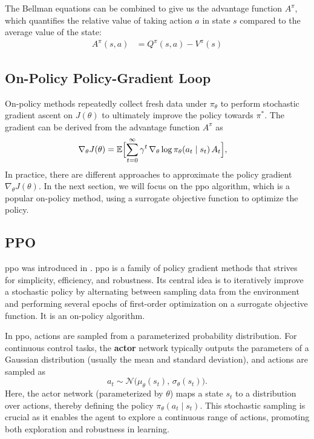 The Bellman equations can be combined to give us the advantage function \(A^\pi\), which quantifies the relative value of taking action \(a\) in state \(s\) compared to the average value of the state:
\begin{align}
\label{eq:advantage}
A^\pi(s,a)
&= Q^\pi(s,a) - V^\pi(s)
\end{align}

\subsection{On-Policy Policy-Gradient Loop}  
On-policy methods repeatedly collect fresh data under \(\pi_\theta\) to perform stochastic gradient ascent on \(J(\theta)\) to ultimately improve the policy towards \(\pi^*\). The gradient can be derived from the advantage function \(A^\pi\) as
\begin{align}
\label{eq:policy_gradient}
\nabla_\theta J(\theta)
&= \mathbb{E}\Bigl[\sum_{t=0}^\infty \gamma^t\,\nabla_\theta \log \pi_\theta(a_t\mid s_t)\,A_t\Bigr],
\end{align}
In practice, there are different approaches to approximate the policy gradient \(\nabla_{\theta}J(\theta)\). In the next section, we will focus on the \gls{ppo} algorithm, which is a popular on-policy method, using a surrogate objective function to optimize the policy.
\subsection{PPO}
\gls{ppo} was introduced in \cite{schulman2017proximal}. \gls{ppo} is a family of policy gradient methods that strives for simplicity, efficiency, and robustness. Its central idea is to iteratively improve a stochastic policy by alternating between sampling data from the environment and performing several epochs of first-order optimization on a surrogate objective function. It is an on-policy algorithm.

In \gls{ppo}, actions are sampled from a parameterized probability distribution. For continuous control tasks, the \textbf{actor} network typically outputs the parameters of a Gaussian distribution (usually the mean and standard deviation), and actions are sampled as
\[
a_t \sim \mathcal{N}\big(\mu_\theta(s_t),\, \sigma_\theta(s_t)\big).
\]
Here, the actor network (parameterized by \(\theta\)) maps a state \(s_t\) to a distribution over actions, thereby defining the policy \(\pi_\theta(a_t \mid s_t)\). This stochastic sampling is crucial as it enables the agent to explore a continuous range of actions, promoting both exploration and robustness in learning.

